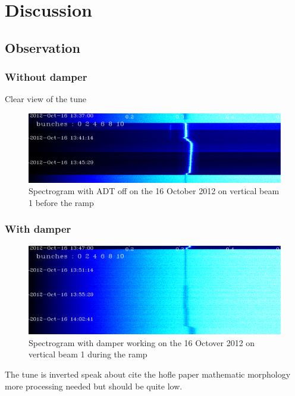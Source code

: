 
\chapter{Discussion}

\section{Observation}

	\subsection{Without damper}

	Clear view of the tune

\begin{figure}[H]
\caption{Spectrogram with ADT off on the 16 October 2012 on vertical beam 1 before the ramp}
\label{fig:adtoff}
\centering
\includegraphics[scale=0.3]{md-121016-vb1-m1-6bunches-10acc-1337-1349-ADT-off.pdf}
\end{figure}

	\subsection{With damper}

\begin{figure}[H]
\caption{Spectrogram with damper working on the 16 Octover 2012 on vertical beam 1 during the ramp}
\centering
\includegraphics[scale=0.3]{md-121016-vb1-m1-6bunches-10acc-1347-1405-ramp.pdf}
\end{figure}

	The tune is inverted speak about cite the hofle paper mathematic morphology more processing needed but should be quite low.


